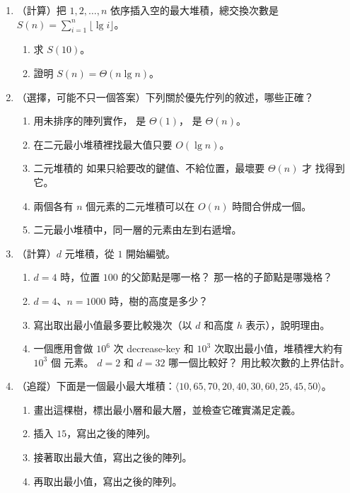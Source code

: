 \begin{enumerate}
\item\label{hp-q-sum} （計算）把 $1, 2, \ldots, n$ 依序插入空的最大堆積，總交換次數是
$S(n) = \sum_{i=1}^{n} \lfloor \lg i \rfloor$。
\begin{enumerate}
\item 求 $S(10)$。
\item 證明 $S(n) = \Theta(n \lg n)$。
\end{enumerate}

\item （選擇，可能不只一個答案）下列關於優先佇列的敘述，哪些正確？
\begin{enumerate}
\item 用未排序的陣列實作， 是 $\Theta(1)$， 是 $\Theta(n)$。
\item 在二元最小堆積裡找最大值只要 $O(\lg n)$。
\item 二元堆積的  如果只給要改的鍵值、不給位置，最壞要 $\Theta(n)$ 才
找得到它。
\item 兩個各有 $n$ 個元素的二元堆積可以在 $O(n)$ 時間合併成一個。
\item 二元最小堆積中，同一層的元素由左到右遞增。
\end{enumerate}

\item （計算）$d$ 元堆積，從 $1$ 開始編號。
\begin{enumerate}
\item $d = 4$ 時，位置 $100$ 的父節點是哪一格？ 那一格的子節點是哪幾格？
\item $d = 4$、$n = 1000$ 時，樹的高度是多少？
\item 寫出取出最小值最多要比較幾次（以 $d$ 和高度 $h$ 表示），說明理由。
\item 一個應用會做 $10^6$ 次 decrease-key 和 $10^3$ 次取出最小值，堆積裡大約有 $10^3$ 個
元素。 $d = 2$ 和 $d = 32$ 哪一個比較好？ 用比較次數的上界估計。
\end{enumerate}

\item （追蹤）下面是一個最小最大堆積：$\langle 10, 65, 70, 20, 40, 30, 60, 25, 45, 50 \rangle$。
\begin{enumerate}
\item 畫出這棵樹，標出最小層和最大層，並檢查它確實滿足定義。
\item 插入 $15$，寫出之後的陣列。
\item 接著取出最大值，寫出之後的陣列。
\item 再取出最小值，寫出之後的陣列。
\end{enumerate}


\end{enumerate}
